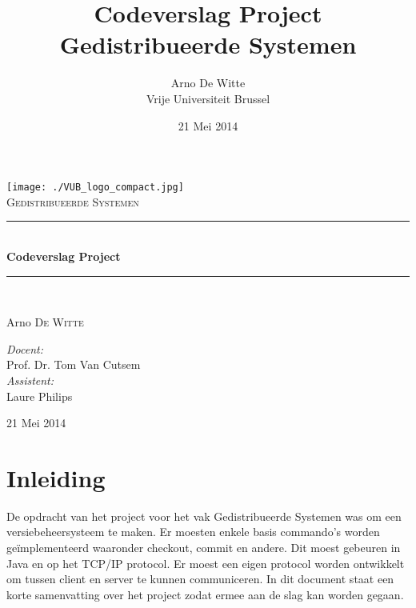 \documentclass{article}
\title{Codeverslag Project Gedistribueerde Systemen}
\author{Arno De Witte\\
Vrije Universiteit Brussel}
\date{21 Mei 2014}
\newcommand{\HRule}{\rule{\linewidth}{0.5mm}}
\newcommand{\thedate}{21 Mei 2014}
\begin{document}
\begin{titlepage}
\begin{center}

\texttt{[image: ./VUB\_logo\_compact.jpg]}~\\[1cm]


\textsc{\Large Gedistribueerde Systemen}\\[0.5cm]

\HRule \\[0.4cm]
{ \huge \bfseries Codeverslag Project}\\[0.4cm]

\HRule \\[1.5cm]

\begin{minipage}{0.4\textwidth}
\begin{flushleft} \large
Arno \textsc{De Witte}\\
\end{flushleft}
\end{minipage}
\begin{minipage}{0.5\textwidth}
\begin{flushright} \large
\emph{Docent:}\\ Prof. Dr. Tom Van Cutsem\\
\emph{Assistent:}\\ Laure Philips
\end{flushright}
\end{minipage}

\vfill

{\large \thedate}

\end{center}
\end{titlepage}

\newpage
\tableofcontents
\newpage


\section{Inleiding}\label{inleiding}
De opdracht van het project voor het vak Gedistribueerde Systemen was om een versiebeheersysteem te maken. Er moesten enkele basis commando's worden ge\"{i}mplementeerd waaronder checkout, commit en andere. Dit moest gebeuren in Java en op het TCP/IP protocol. Er moest een eigen protocol worden ontwikkelt om tussen client en server te kunnen communiceren. In dit document staat een korte samenvatting over het project zodat ermee aan de slag kan worden gegaan.
\end{document}
